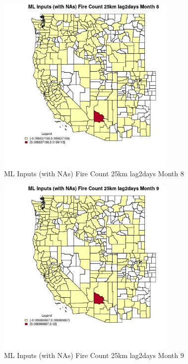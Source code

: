 \begin{figure} 
\centering  
\includegraphics[width=0.77\textwidth]{Code_Outputs/Report_ML_input_PM25_Step4_part_e_de_duplicated_aves_compiled_2019-05-21wNAs_CountyFire_Count_25km_lag2daysmedianMonth8.jpg} 
\caption{\label{fig:Report_ML_input_PM25_Step4_part_e_de_duplicated_aves_compiled_2019-05-21wNAsCountyFire_Count_25km_lag2daysmedianMonth8}ML Inputs (with NAs) Fire Count 25km lag2days Month 8} 
\end{figure} 
 

\begin{figure} 
\centering  
\includegraphics[width=0.77\textwidth]{Code_Outputs/Report_ML_input_PM25_Step4_part_e_de_duplicated_aves_compiled_2019-05-21wNAs_CountyFire_Count_25km_lag2daysmedianMonth9.jpg} 
\caption{\label{fig:Report_ML_input_PM25_Step4_part_e_de_duplicated_aves_compiled_2019-05-21wNAsCountyFire_Count_25km_lag2daysmedianMonth9}ML Inputs (with NAs) Fire Count 25km lag2days Month 9} 
\end{figure} 
 

